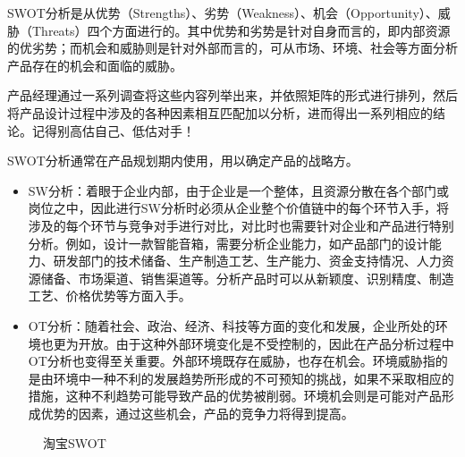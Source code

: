 \documentclass[letterpaper,10pt,english]{sphinxmanual}
\begin{document}
SWOT分析是从优势（Strengths）、劣势（Weakness）、机会（Opportunity）、威胁（Threats）四个方面进行的。其中优势和劣势是针对自身而言的，即内部资源的优劣势；而机会和威胁则是针对外部而言的，可从市场、环境、社会等方面分析产品存在的机会和面临的威胁。

产品经理通过一系列调查将这些内容列举出来，并依照矩阵的形式进行排列，然后将产品设计过程中涉及的各种因素相互匹配加以分析，进而得出一系列相应的结论。记得别高估自己、低估对手！
%
\begin{footnote}[554]\sphinxAtStartFootnote
{}
%
\end{footnote}

SWOT分析通常在产品规划期内使用，用以确定产品的战略方。
\begin{itemize}
\item {} 
SW分析：着眼于企业内部，由于企业是一个整体，且资源分散在各个部门或岗位之中，因此进行SW分析时必须从企业整个价值链中的每个环节入手，将涉及的每个环节与竞争对手进行对比，对比时也需要针对企业和产品进行特别分析。例如，设计一款智能音箱，需要分析企业能力，如产品部门的设计能力、研发部门的技术储备、生产制造工艺、生产能力、资金支持情况、人力资源储备、市场渠道、销售渠道等。分析产品时可以从新颖度、识别精度、制造工艺、价格优势等方面入手。

\item {} 
OT分析：随着社会、政治、经济、科技等方面的变化和发展，企业所处的环境也更为开放。由于这种外部环境变化是不受控制的，因此在产品分析过程中OT分析也变得至关重要。外部环境既存在威胁，也存在机会。环境威胁指的是由环境中一种不利的发展趋势所形成的不可预知的挑战，如果不采取相应的措施，这种不利趋势可能导致产品的优势被削弱。环境机会则是可能对产品形成优势的因素，通过这些机会，产品的竞争力将得到提高。

\end{itemize}

\begin{figure}[H]
\centering
\capstart

\noindent{}
\caption{淘宝SWOT\sphinxfootnotemark[555]}\label{\detokenize{chapter_knowledge/compete_analysis:id10}}\end{figure}
%
\begin{footnotetext}[555]\sphinxAtStartFootnote
{}
%
\end{footnotetext}\ignorespaces 
\end{document}
